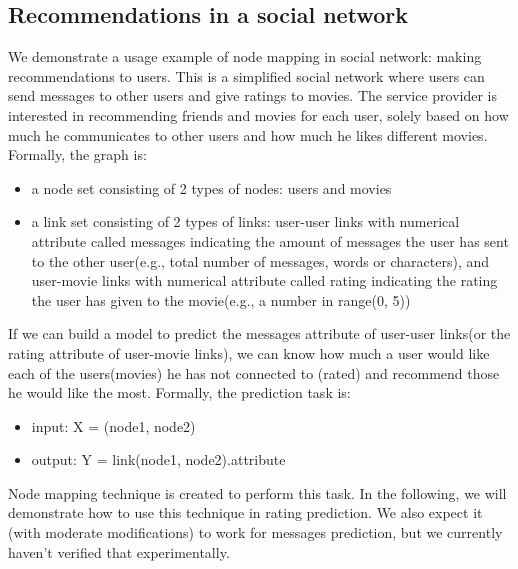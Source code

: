 \documentclass{article}
\begin{document}
\subsection{Recommendations in a social network}
We demonstrate a usage example of node mapping in social network: making 
recommendations to users.
This is a simplified social network where users can send messages to other 
users and give ratings to movies.
The service provider is interested in recommending friends and movies for each 
user, solely based on how much he communicates to other users and how much 
he likes different movies.
Formally, the graph is:
\begin{itemize}
	\item a node set consisting of 2 types of nodes: users and movies
	\item a link set consisting of 2 types of links: user-user links with 
	numerical attribute called messages indicating the amount of messages the 
	user has sent to the other 	user(e.g., total number of messages, words 
	or characters),
	and user-movie links with numerical attribute called rating indicating the 
	rating the user has given to the movie(e.g., a number in range(0, 5))
\end{itemize}
If we can build a model to predict the messages attribute of user-user links(or 
the rating attribute of user-movie links), we can know how much a user would 
like each of the users(movies) he has not connected to (rated) and recommend 
those he would like the most.
Formally, the prediction task is:
\begin{itemize}
	\item input: X = (node1, node2)
	\item output: Y = link(node1, node2).attribute
\end{itemize}
Node mapping technique is created to perform this task. In the following, we 
will demonstrate how to use this technique in rating prediction. We also expect 
it (with moderate modifications) to work for messages prediction, but we 
currently haven't verified that experimentally.
\end{document}
